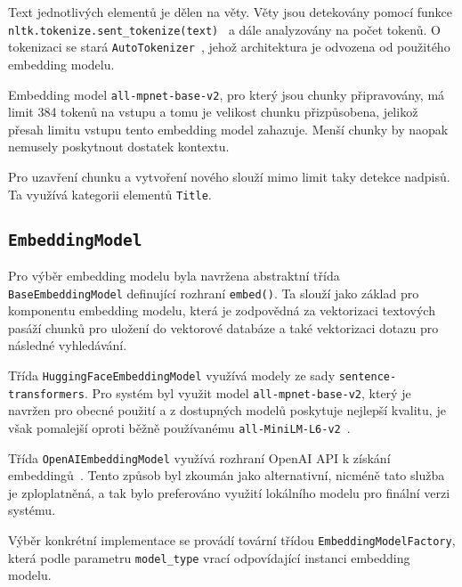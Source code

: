 \begin{enumerate}
    Text jednotlivých elementů je dělen na věty. Věty jsou detekovány pomocí funkce \texttt{nltk.tokenize.sent\_tokenize(text)}~\cite{nltk} a dále analyzovány na počet tokenů. O tokenizaci se stará \texttt{AutoTokenizer}~\cite{tokenizerhuggingface}, jehož architektura je odvozena od použitého embedding modelu.
    
    Embedding model \texttt{all-mpnet-base-v2}, pro který jsou chunky připravovány, má limit 384 tokenů na vstupu a tomu je velikost chunku přizpůsobena, jelikož přesah limitu vstupu tento embedding model zahazuje. Menší chunky by naopak nemusely poskytnout dostatek kontextu.

    Pro uzavření chunku a vytvoření nového slouží mimo limit taky detekce nadpisů. Ta využívá kategorii elementů \texttt{Title}.
\end{enumerate}

\subsection{\texttt{EmbeddingModel}}
Pro výběr embedding modelu byla navržena abstraktní třída \texttt{BaseEmbeddingModel} definující rozhraní \texttt{embed()}. Ta slouží jako základ pro komponentu embedding modelu, která je zodpovědná za vektorizaci textových pasáží chunků pro uložení do vektorové databáze a také vektorizaci dotazu pro následné vyhledávání.

Třída \texttt{HuggingFaceEmbeddingModel} využívá modely ze sady \texttt{sentence-transformers}. Pro systém byl využit model \texttt{all-mpnet-base-v2}, který je navržen pro obecné použití a z dostupných modelů poskytuje nejlepší kvalitu, je však pomalejší oproti běžně používanému \texttt{all-MiniLM-L6-v2}~\cite{sentence-tranformers}.  

Třída \texttt{OpenAIEmbeddingModel} využívá rozhraní OpenAI API k získání embeddingů~\cite{openaidocs}. Tento způsob byl zkoumán jako alternativní, nicméně tato služba je zploplatněná, a tak bylo preferováno využití lokálního modelu pro finální verzi systému. 

Výběr konkrétní implementace se provádí tovární třídou \texttt{EmbeddingModelFactory}, která podle parametru \texttt{model\_type} vrací odpovídající instanci embedding modelu.

